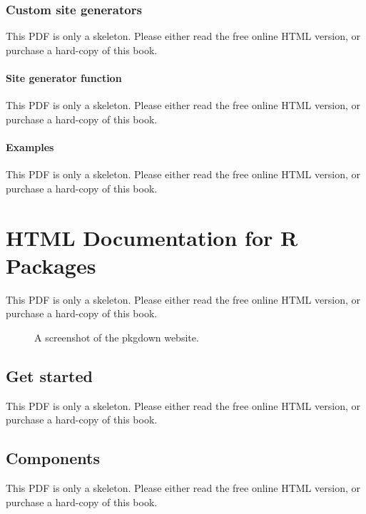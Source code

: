 \documentclass[
  11pt,
]{krantz}
\theoremstyle{definition}
\theoremstyle{definition}
\theoremstyle{definition}
\theoremstyle{definition}
\theoremstyle{remark}
\begin{document}
\subsection{Custom site generators}\label{custom-site-generators}

This PDF is only a skeleton. Please either read the free online HTML version, or purchase a hard-copy of this book.

\subsubsection{Site generator function}\label{site-generator-function}

This PDF is only a skeleton. Please either read the free online HTML version, or purchase a hard-copy of this book.

\subsubsection{Examples}\label{examples}

This PDF is only a skeleton. Please either read the free online HTML version, or purchase a hard-copy of this book.

\chapter{HTML Documentation for R Packages}\label{pkgdown}

This PDF is only a skeleton. Please either read the free online HTML version, or purchase a hard-copy of this book.

\begin{figure}\caption{A screenshot of the pkgdown website.}\end{figure}

\section{Get started}\label{pkgdown-start}

This PDF is only a skeleton. Please either read the free online HTML version, or purchase a hard-copy of this book.

\section{Components}\label{pkgdown-components}

This PDF is only a skeleton. Please either read the free online HTML version, or purchase a hard-copy of this book.
\end{document}
